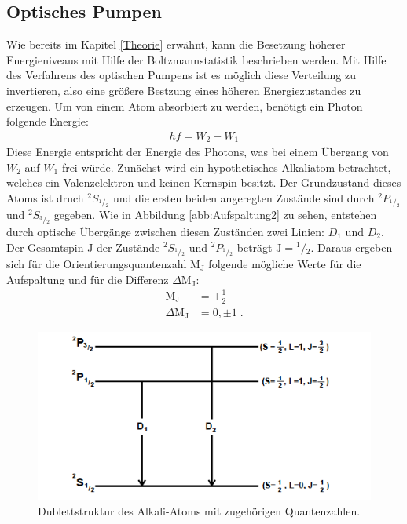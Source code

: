 \subsection{Optisches Pumpen}
Wie bereits im Kapitel \ref{Theorie} erwähnt, kann die Besetzung höherer Energieniveaus mit Hilfe der Boltzmannstatistik beschrieben werden.
Mit Hilfe des Verfahrens des optischen Pumpens ist es möglich diese Verteilung zu invertieren, also eine größere Bestzung eines höheren Energiezustandes zu erzeugen.
Um von einem Atom absorbiert zu werden, benötigt ein Photon folgende Energie:
\begin{align*}
    hf = W_{2} - W_{1}
\end{align*}
Diese Energie entspricht der Energie des Photons, was bei einem Übergang von $W_{2}$ auf $W_{1}$ frei würde.
Zunächst wird ein hypothetisches Alkaliatom betrachtet, welches ein Valenzelektron und keinen Kernspin besitzt.
Der Grundzustand dieses Atoms ist druch ${}^2S_{{}^1\!/\!_2}$ und die ersten beiden angeregten Zustände sind durch ${}^2P_{{}^1\!/\!_2}$ und ${}^2S_{{}^3\!/\!_2}$ gegeben. Wie in Abbildung \ref{abb:Aufspaltung2} zu sehen, entstehen durch optische Übergänge zwischen diesen Zuständen zwei Linien: $D_{1}$ und $ D_{2} $.
Der Gesamtspin J der Zustände ${}^2S_{{}^1\!/\!_2}$ und ${}^2P_{{}^1\!/\!_2}$ beträgt $\text{J}= {}^1\!/\!_2$. Daraus ergeben sich für die Orientierungsquantenzahl $\text{M}_\text{J}$ folgende mögliche Werte für die Aufspaltung und für die Differenz $\Delta \text{M}_\text{J}$:
\begin{align*}
    \text{M}_\text{J} &= \pm \frac{1}{2} \\
    \Delta \text{M}_\text{J} &= 0, \pm 1 \; .
\end{align*}
\FloatBarrier
\begin{figure}
  \centering
  \includegraphics[scale=0.4]{Aufspaltung2.PNG}
  \caption{Dublettstruktur des Alkali-Atoms mit zugehörigen Quantenzahlen. \cite{Q1}}
  \label{abb:D1D2}
\end{figure}
